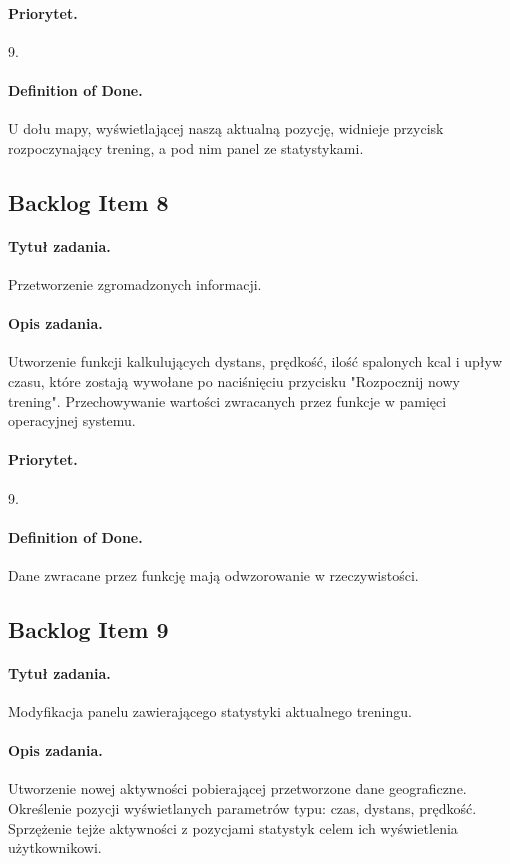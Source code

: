 \documentclass[a4paper]{article}
\begin{document}
\paragraph{Priorytet.} 9.
\paragraph{Definition of Done.} U dołu mapy, wyświetlającej naszą aktualną pozycję, widnieje przycisk rozpoczynający trening, a pod nim panel ze statystykami.

\subsection{Backlog Item 8}
\paragraph{Tytuł zadania.} Przetworzenie zgromadzonych informacji.
\paragraph{Opis zadania.} Utworzenie funkcji kalkulujących dystans, prędkość, ilość spalonych kcal i upływ czasu, które zostają wywołane po naciśnięciu przycisku "Rozpocznij nowy trening". Przechowywanie wartości zwracanych przez funkcje w pamięci operacyjnej systemu.
\paragraph{Priorytet.} 9.
\paragraph{Definition of Done.} Dane zwracane przez funkcję mają odwzorowanie w rzeczywistości.

\subsection{Backlog Item 9}
\paragraph{Tytuł zadania.} Modyfikacja panelu zawierającego statystyki aktualnego treningu.
\paragraph{Opis zadania.} Utworzenie nowej aktywności pobierającej przetworzone dane geograficzne. Określenie pozycji wyświetlanych parametrów typu: czas, dystans, prędkość. Sprzężenie tejże aktywności z pozycjami statystyk celem ich wyświetlenia użytkownikowi.
\end{document}
